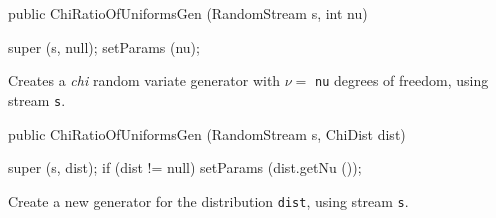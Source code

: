 \begin{code}

   public ChiRatioOfUniformsGen (RandomStream s, int nu) \begin{hide} {
      super (s, null);
      setParams (nu);
   }\end{hide}
\end{code}
  \begin{tabb} Creates a \emph{chi}  random variate generator with 
 $\nu =$ \texttt{nu} degrees of freedom, using stream \texttt{s}. 
  \end{tabb}
\begin{code}

   public ChiRatioOfUniformsGen (RandomStream s, ChiDist dist) \begin{hide} {
      super (s, dist);
      if (dist != null)
         setParams (dist.getNu ());
   }\end{hide}
\end{code}
  \begin{tabb}  Create a new generator for the distribution \texttt{dist},
     using stream \texttt{s}. 
  \end{tabb}


